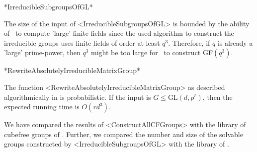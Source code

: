 *IrreducibleSubgroupsOfGL*

The size of the input of <IrreducibleSubgroupsOfGL> is bounded by the
ability of \GAP ~to compute 'large' finite fields since the used algorithm to
construct the irreducible groups uses finite fields of
order at least $q^3$. Therefore, if $q$ is already a 'large' prime-power, then
$q^3$ might be too large for \GAP ~to construct GF$(q^3)$. 



*RewriteAbsolutelyIrreducibleMatrixGroup*

The function <RewriteAbsolutelyIrreducibleMatrixGroup> as described
algorithmically in
\cite{GlHo97} is probabilistic. If the input is $G\leq$GL$(d,p^r)$, then the
expected running time is $O(rd^3)$.



We have compared the results of <ConstructAllCFGroups> with the library of
cubefree groups of {\GrpConst}. Further, we compared the number and size of the
solvable groups constructed by <IrreducibleSubgroupsOfGL> with the library of {\Irredsol}.



